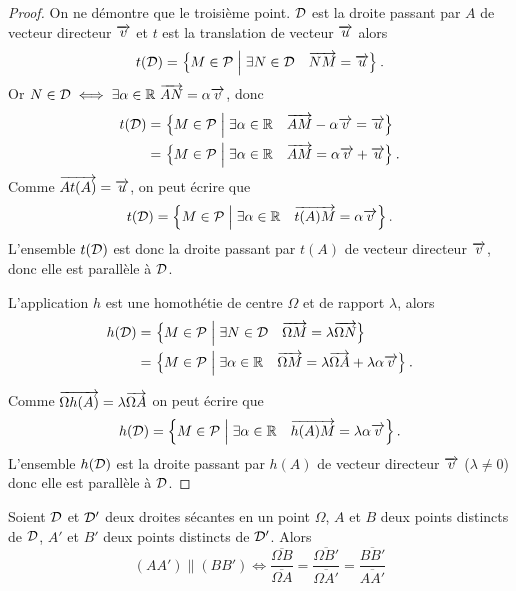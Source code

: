 \begin{proof} On ne démontre que le troisième point. \(\mathcal{D}\) est la droite 
  passant par \(A\) de vecteur directeur \(\overrightarrow{v}\) et \(t\) est la translation 
  de vecteur \(\overrightarrow{u}\) alors
  \begin{equation}
    t(\mathcal{D}) = \left\{M \in \mathcal{P}\mathrel{}\middle|\mathrel{}\exists N \in \mathcal{D} \quad \overrightarrow{NM} = \overrightarrow{u}\right\}.
  \end{equation}
  Or \(N \in \mathcal{D} \iff \exists \alpha \in \mathbb{R} \ \overrightarrow{AN} = \alpha \overrightarrow{v}\), donc
  \begin{align}
    t(\mathcal{D})& = \left\{M \in \mathcal{P}\mathrel{}\middle|\mathrel{}\exists \alpha \in \mathbb{R} \quad \overrightarrow{AM}-\alpha 
    \overrightarrow{v} = \overrightarrow{u}\right\} \\
          & = \left\{M \in \mathcal{P}\mathrel{}\middle|\mathrel{}\exists \alpha \in \mathbb{R} \quad \overrightarrow{AM} = 
          \alpha \overrightarrow{v} + \overrightarrow{u}\right\}.
  \end{align}
  Comme \(\overrightarrow{At(A)} = \overrightarrow{u}\), on peut écrire que 
  \begin{equation}
    t(\mathcal{D}) = \left\{M \in \mathcal{P}\mathrel{}\middle|\mathrel{}\exists \alpha \in \mathbb{R} \quad \overrightarrow{t(A)M} = 
    \alpha \overrightarrow{v}\right\}.
  \end{equation}
  L'ensemble \(t(\mathcal{D})\) est donc la droite passant par \(t(A)\) de vecteur 
  directeur \(\overrightarrow{v}\), donc elle est parallèle à \(\mathcal{D}\).

  L'application \(h\) est une homothétie de centre \(\Omega\) et de 
  rapport \(\lambda\), alors
  \begin{align}
    h(\mathcal{D})& = \left\{M \in \mathcal{P}\mathrel{}\middle|\mathrel{}\exists N \in \mathcal{D} \quad \overrightarrow{\Omega M} = 
    \lambda \overrightarrow{\Omega N}\right\}\\
          & = \left\{M \in \mathcal{P}\mathrel{}\middle|\mathrel{}\exists \alpha \in \mathbb{R} \quad \overrightarrow{\Omega M} 
          = \lambda \overrightarrow{\Omega A} + \lambda\alpha \overrightarrow{v}\right\}.
  \end{align}

  Comme \(\overrightarrow{\Omega h(A)} = \lambda \overrightarrow{\Omega A}\) on peut écrire 
  que 
  \begin{equation}
    h(\mathcal{D}) = \left\{M \in \mathcal{P}\mathrel{}\middle|\mathrel{}\exists \alpha \in \mathbb{R} \quad \overrightarrow{h(A) M} 
    = \lambda\alpha \overrightarrow{v}\right\}.
  \end{equation}
  L'ensemble \(h(\mathcal{D})\) est la droite passant par \(h(A)\) de vecteur 
  directeur \(\overrightarrow{v}\) (\(\lambda \neq 0\)) donc elle est parallèle à 
  \(\mathcal{D}\).
\end{proof}

\begin{theo}
  Soient \(\mathcal{D}\) et \(\mathcal{D}'\) deux droites sécantes en un point 
  \(\Omega\), \(A\) et \(B\) deux points distincts de \(\mathcal{D}\), \(A'\) et 
  \(B'\) deux points distincts de \(\mathcal{D}'\). Alors
  \begin{equation}
    (AA') \parallel (BB') \iff \frac{\overline{\Omega 
    B}}{\overline{\Omega A}} = \frac{\overline{\Omega 
    B'}}{\overline{\Omega A'}} = \frac{\overline{BB'}}{\overline{AA'}}
  \end{equation}
\end{theo}

